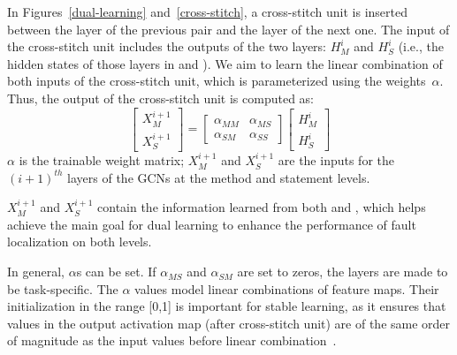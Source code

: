 In Figures~\ref{dual-learning} and~\ref{cross-stitch}, a cross-stitch
unit is inserted between the  layer of the previous pair
and the  layer of the next one. The input of the
cross-stitch unit includes the outputs of the two  layers:
$H_M^i$ and $H_S^i$ (i.e., the hidden states of those layers in
 and ). We aim to learn the linear
combination of both inputs of the cross-stitch unit, which is
parameterized using the weights~$\alpha$.
%
Thus, the output of the cross-stitch unit is computed as:
\begin{equation}\label{cross-stitch-formula}
	\begin{bmatrix}
		X_M^{i+1}\\
		X_S^{i+1}
	\end{bmatrix}
        =
        \begin{bmatrix}
		\alpha_{MM} &  \alpha_{MS} \\
		\alpha_{SM} &  \alpha_{SS}
	\end{bmatrix}
	\begin{bmatrix}
		H_M^{i}\\
		H_S^{i}
	\end{bmatrix}
\end{equation}
$\alpha$ is the trainable weight matrix; $X_M^{i+1}$ and
$X_S^{i+1}$ are the inputs for the $(i+1)^{th}$ layers of the GCNs at the
method and statement levels.

$X_M^{i+1}$ and $X_S^{i+1}$ contain the information learned from both
 and , which helps achieve the main goal for
dual learning to enhance the performance of fault localization on both
levels.

In general, $\alpha$s can be set. If $\alpha_{MS}$ and $\alpha_{SM}$
are set to zeros, the layers are made to be task-specific.  The
$\alpha$ values model linear combinations of feature maps. Their
initialization in the range [0,1] is important for stable learning, as
it ensures that values in the output activation map (after
cross-stitch unit) are of the same order of magnitude as the input
values before linear combination~\cite{misra2016cross}.





